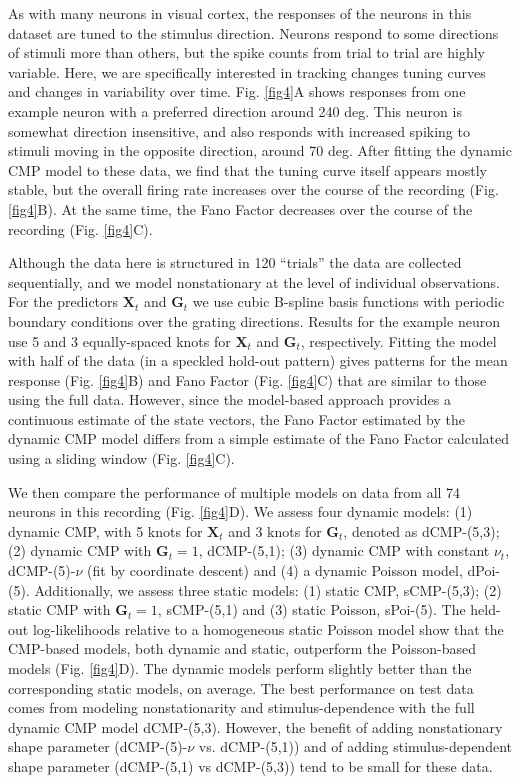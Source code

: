 \documentclass[aoas]{imsart}
\theoremstyle{plain}
\theoremstyle{remark}
\begin{document}
As with many neurons in visual cortex, the responses of the neurons in this dataset are tuned to the stimulus direction. Neurons respond to some directions of stimuli more than others, but the spike counts from trial to trial are highly variable. Here, we are specifically interested in tracking changes tuning curves and changes in variability over time. Fig. \ref{fig4}A shows responses from one example neuron with a preferred direction around 240 deg. This neuron is somewhat direction insensitive, and also responds with increased spiking to stimuli moving in the opposite direction, around 70 deg. After fitting the dynamic CMP model to these data, we find that the tuning curve itself appears mostly stable, but the overall firing rate increases over the course of the recording (Fig. \ref{fig4}B). At the same time, the Fano Factor decreases over the course of the recording (Fig. \ref{fig4}C). 

Although the data here is structured in 120 “trials” the data are collected sequentially, and we model nonstationary at the level of individual observations. For the predictors $\bm{X}_t$ and $\bm{G}_t$ we use cubic B-spline basis functions with periodic boundary conditions over the grating directions. Results for the example neuron use 5 and 3 equally-spaced knots for $\bm{X}_t$ and $\bm{G}_t$, respectively. Fitting the model with half of the data (in a speckled hold-out pattern) gives patterns for the mean response (Fig. \ref{fig4}B) and Fano Factor (Fig. \ref{fig4}C) that are similar to those using the full data. However, since the model-based approach provides a continuous estimate of the state vectors, the Fano Factor estimated by the dynamic CMP model differs from a simple estimate of the Fano Factor calculated using a sliding window (Fig. \ref{fig4}C).

We then compare the performance of multiple models on data from all 74 neurons in this recording (Fig. \ref{fig4}D). We assess four dynamic models: (1) dynamic CMP, with 5 knots for $\bm{X}_t$ and 3 knots for $\bm{G}_t$, denoted as dCMP-(5,3); (2) dynamic CMP with $\bm{G}_t=1$, dCMP-(5,1); (3) dynamic CMP with constant $\nu_t$, dCMP-(5)-$\nu$ (fit by coordinate descent) and (4) a dynamic Poisson model, dPoi-(5). Additionally, we assess three static models: (1) static CMP, sCMP-(5,3); (2) static CMP with $\bm{G}_t=1$, sCMP-(5,1) and (3) static Poisson, sPoi-(5). The held-out log-likelihoods relative to a homogeneous static Poisson model show that the CMP-based models, both dynamic and static, outperform the Poisson-based models (Fig. \ref{fig4}D). The dynamic models perform slightly better than the corresponding static models, on average. The best performance on test data comes from modeling nonstationarity and stimulus-dependence with the full dynamic CMP model dCMP-(5,3). However, the benefit of adding nonstationary shape parameter (dCMP-(5)-$\nu$ vs. dCMP-(5,1)) and of adding stimulus-dependent shape parameter (dCMP-(5,1) vs dCMP-(5,3)) tend to be small for these data.
\end{document}
